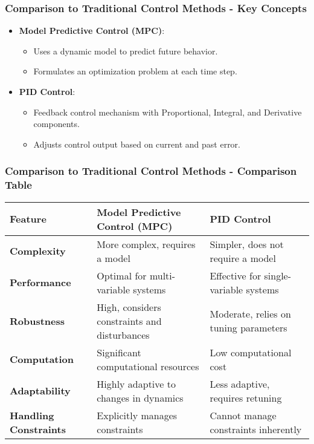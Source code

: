 \documentclass[aspectratio=169]{beamer}
\begin{document}
\begin{frame}[fragile]
    \frametitle{Comparison to Traditional Control Methods - Key Concepts}
    \begin{itemize}
        \item \textbf{Model Predictive Control (MPC)}:
        \begin{itemize}
            \item Uses a dynamic model to predict future behavior.
            \item Formulates an optimization problem at each time step.
        \end{itemize}
        
        \item \textbf{PID Control}:
        \begin{itemize}
            \item Feedback control mechanism with Proportional, Integral, and Derivative components.
            \item Adjusts control output based on current and past error.
        \end{itemize}
    \end{itemize}
\end{frame}

\begin{frame}[fragile]
    \frametitle{Comparison to Traditional Control Methods - Comparison Table}
    \begin{table}
        \centering
        \begin{tabular}{@{}lll@{}}
            \toprule
            \textbf{Feature} & \textbf{Model Predictive Control (MPC)} & \textbf{PID Control} \\ \midrule
            \textbf{Complexity} & More complex, requires a model                     & Simpler, does not require a model      \\
            \textbf{Performance} & Optimal for multi-variable systems                 & Effective for single-variable systems    \\
            \textbf{Robustness}   & High, considers constraints and disturbances    & Moderate, relies on tuning parameters     \\
            \textbf{Computation} & Significant computational resources               & Low computational cost                    \\
            \textbf{Adaptability} & Highly adaptive to changes in dynamics          & Less adaptive, requires retuning          \\
            \textbf{Handling Constraints} & Explicitly manages constraints          & Cannot manage constraints inherently       \\ \bottomrule
        \end{tabular}
    \end{table}
\end{frame}
\end{document}
